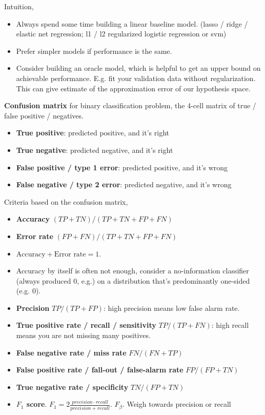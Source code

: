 \documentclass{article}
\begin{document}
Intuition,
\begin{itemize}
\item Always spend some time building a linear baseline model. (lasso / ridge / elastic net regression; l1 / l2 regularized logistic regression or svm)
\item Prefer simpler models if performance is the same.
\item Consider building an oracle model, which is helpful to get an upper bound on achievable performance. E.g. fit your validation data without regularization. This can give estimate of the approximation error of our hypothesis space.
\end{itemize}

\textbf{Confusion matrix} for binary classification problem, the 4-cell matrix of true / false positive / negatives.

\begin{itemize}
\item \textbf{True positive}: predicted positive, and it's right
\item \textbf{True negative}: predicted negative, and it's right
\item \textbf{False positive / type 1 error}: predicted positive, and it's wrong
\item \textbf{False negative / type 2 error}: predicted negative, and it's wrong
\end{itemize}

Criteria based on the confusion matrix,
\begin{itemize}
\item \textbf{Accuracy} $(TP + TN) / (TP + TN + FP + FN)$
\item \textbf{Error rate} $(FP + FN) / (TP + TN + FP + FN)$
\item $\text{Accuracy} + \text{Error rate} = 1$.
\item Accuracy by itself is often not enough, consider a no-information classifier (always produced 0, e.g.) on a distribution that's predominantly one-sided (e.g. 0).
\item \textbf{Precision} $TP / (TP + FP)$: high precision means low false alarm rate.
\item \textbf{True positive rate / recall / sensitivity} $TP / (TP + FN)$: high recall means you are not missing many positives.
\item \textbf{False negative rate / miss rate} $FN / (FN + TP)$
\item \textbf{False positive rate / fall-out / false-alarm rate} $FP / (FP + TN)$
\item \textbf{True negative rate / specificity} $TN / (FP + TN)$
\item \textbf{$F_1$ score}. $F_1 = 2 \frac{precision \cdot recall}{precision + recall}$. $F_{\beta}$. Weigh towards precision or recall
\end{itemize}
\end{document}
